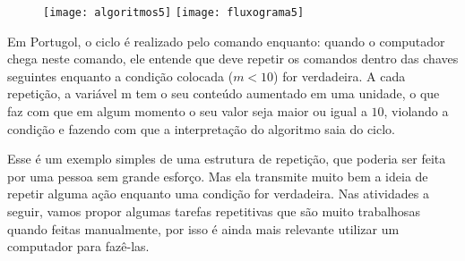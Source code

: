 \begin{figure}[H]
\centering

\texttt{[image: algoritmos5]}
\hspace{1em}
\texttt{[image: fluxograma5]}
\end{figure}

Em Portugol, o ciclo é realizado pelo comando enquanto: quando o computador chega neste comando, ele entende que deve repetir os comandos dentro das chaves seguintes enquanto a condição colocada ($m<10$) for verdadeira. A cada repetição, a variável m tem o seu conteúdo aumentado em uma unidade, o que faz com que em algum momento o seu valor seja maior ou igual a $10$, violando a condição e fazendo com que a interpretação do algoritmo saia do ciclo.

Esse é um exemplo simples de uma estrutura de repetição, que poderia ser feita por uma pessoa sem grande esforço. Mas ela transmite muito bem a ideia de repetir alguma ação enquanto uma condição for verdadeira. Nas atividades a seguir, vamos propor algumas tarefas repetitivas que são muito trabalhosas quando feitas manualmente, por isso é ainda mais relevante utilizar um computador para fazê-las.


